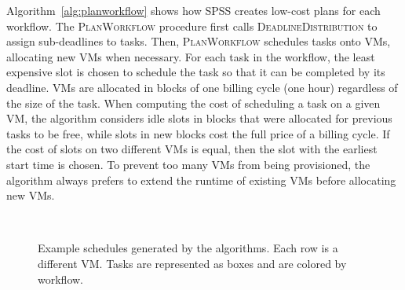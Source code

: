 \documentclass[conference]{IEEEtran}
\begin{document}
Algorithm~\ref{alg:planworkflow} shows how SPSS creates low-cost plans for each
workflow. The \textsc{PlanWorkflow} procedure first calls
\textsc{DeadlineDistribution} to assign sub-deadlines to tasks.
Then, \textsc{PlanWorkflow} schedules
tasks onto VMs, allocating new VMs when necessary. For each task in the
workflow, the least expensive slot is chosen to schedule the task so that it can
be completed by  its deadline. VMs are allocated in blocks of one billing cycle
(one hour) regardless of the size of the task. When computing the cost of
scheduling a task on a given VM, the algorithm considers idle slots in blocks
that were allocated for previous tasks to be free, while slots in new blocks
cost the full price of a billing cycle. 
If the cost of slots on two different
VMs is equal, then the slot with the earliest start time is chosen. To prevent too
many VMs from being provisioned, the algorithm always prefers to extend the
runtime of existing VMs before allocating new VMs. 

\begin{figure}[tb] 
  \centering
  \\
  \caption[Example schedules generated by the algorithms]{Example
  schedules generated by the algorithms. Each row is a different
  VM. Tasks are represented as boxes and are colored by workflow.}
  \label{fig:algorithm-example}
\end{figure}
\end{document}

